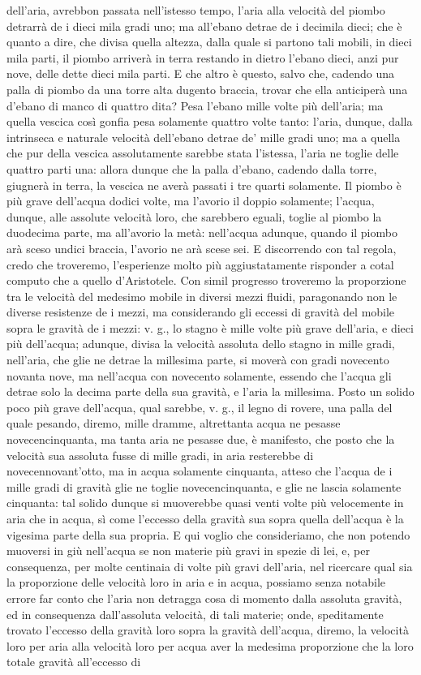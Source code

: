 \documentclass[11pt,twoside,openany]{book}
\begin{document}
dell'aria, avrebbon passata nell'istesso tempo, l'aria alla velocità del piombo detrarrà de i dieci mila gradi uno; ma all'ebano detrae de i decimila dieci; che è quanto a dire, che divisa quella altezza, dalla quale si partono tali mobili, in dieci mila parti, il piombo arriverà in terra restando in dietro l'ebano dieci, anzi pur nove, delle dette dieci mila parti. E che altro è questo, salvo che, cadendo una palla di piombo da una torre alta dugento braccia, trovar che ella anticiperà una d'ebano di manco di quattro dita? Pesa l'ebano mille volte più dell'aria; ma quella vescica così gonfia pesa solamente quattro volte tanto: l'aria, dunque, dalla intrinseca e naturale velocità dell'ebano detrae de' mille gradi uno; ma a quella che pur della vescica assolutamente sarebbe stata l'istessa, l'aria ne toglie delle quattro parti una: allora dunque che la palla d'ebano, cadendo dalla torre, giugnerà in terra, la vescica ne averà passati i tre quarti solamente. Il piombo è più grave dell'acqua dodici volte, ma l'avorio il doppio solamente; l'acqua, dunque, alle assolute velocità loro, che sarebbero eguali, toglie al piombo la duodecima parte, ma all'avorio la metà: nell'acqua adunque, quando il piombo arà sceso undici braccia, l'avorio ne arà scese sei. E discorrendo con tal regola, credo che troveremo, l'esperienze molto più aggiustatamente risponder a cotal computo che a quello d'Aristotele. Con simil progresso troveremo la proporzione tra le velocità del medesimo mobile in diversi mezzi fluidi, paragonando non le diverse resistenze de i mezzi, ma considerando gli eccessi di gravità del mobile sopra le gravità de i mezzi: v. g., lo stagno è mille volte più grave dell'aria, e dieci più dell'acqua; adunque, divisa la velocità assoluta dello stagno in mille gradi, nell'aria, che glie ne detrae la millesima parte, si moverà con gradi novecento novanta nove, ma nell'acqua con novecento solamente, essendo che l'acqua gli detrae solo la decima parte della sua gravità, e l'aria la millesima. Posto un solido poco più grave dell'acqua, qual sarebbe, v. g., il legno di rovere, una palla del quale pesando, diremo, mille dramme, altrettanta acqua ne pesasse novecencinquanta, ma tanta aria ne pesasse due, è manifesto, che posto che la velocità sua assoluta fusse di mille gradi, in aria resterebbe di novecennovant'otto, ma in acqua solamente cinquanta, atteso che l'acqua de i mille gradi di gravità glie ne toglie novecencinquanta, e glie ne lascia solamente cinquanta: tal solido dunque si muoverebbe quasi venti volte più velocemente in aria che in acqua, sì come l'eccesso della gravità sua sopra quella dell'acqua è la vigesima parte della sua propria. E qui voglio che consideriamo, che non potendo muoversi in giù nell'acqua se non materie più gravi in spezie di lei, e, per consequenza, per molte centinaia di volte più gravi dell'aria, nel ricercare qual sia la proporzione delle velocità loro in aria e in acqua, possiamo senza notabile errore far conto che l'aria non detragga cosa di momento dalla assoluta gravità, ed in consequenza dall'assoluta velocità, di tali materie; onde, speditamente trovato l'eccesso della gravità loro sopra la gravità dell'acqua, diremo, la velocità loro per aria alla velocità loro per acqua aver la medesima proporzione che la loro totale gravità all'eccesso di 
\end{document}

